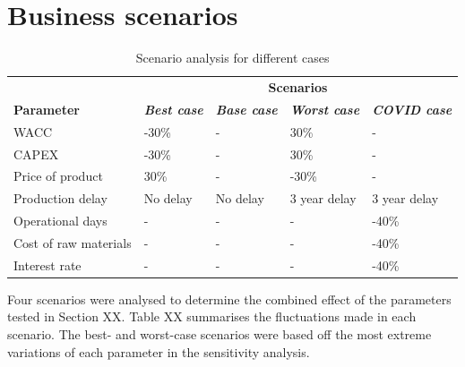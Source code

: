 
\section{Business scenarios}

\begin{table}[H]
\centering
\caption{Scenario analysis for different cases}
\label{scenario_analysis}
\begin{tabular}{l|llll}
\rowcolor[HTML]{D2F3FA} 
                      & \multicolumn{4}{c}{\cellcolor[HTML]{D2F3FA}\textbf{Scenarios}}                                                          \\
\rowcolor[HTML]{D2F3FA} 
\textbf{Parameter}    & \textit{\textbf{Best case}} & \textit{\textbf{Base case}} & \textit{\textbf{Worst case}} & \textit{\textbf{COVID case}} \\
WACC                  & -30\%                       & -                          & 30\%                         & -                            \\
CAPEX                 & -30\%                       & -                          & 30\%                         & -                            \\
Price of product      & 30\%                        & -                          & -30\%                        & -                            \\
Production delay      & No delay                    & No delay                   & 3 year delay                 & 3 year delay                 \\
Operational days      & -                           & -                          & -                            & -40\%                        \\
Cost of raw materials & -                           & -                          & -                            & -40\%                        \\
Interest rate         & -                           & -                          & -                            & -40\%                       
\end{tabular}
\end{table}


Four scenarios were analysed to determine the combined effect of the parameters tested in Section XX. Table XX summarises the fluctuations made in each scenario. The best- and worst-case scenarios were based off the most extreme variations of each parameter in the sensitivity analysis. 

